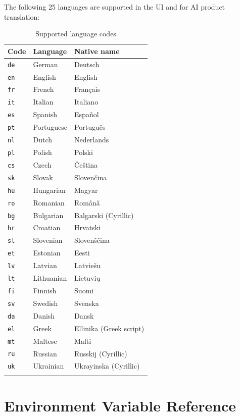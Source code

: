 \documentclass[12pt,a4paper,twoside]{report}
\newcommand{\code}[1]{\texttt{#1}}
\begin{document}
The following 25 languages are supported in the UI and for AI product
translation:

\begin{longtable}{@{}lll@{}}
  \toprule
  \textbf{Code} & \textbf{Language} & \textbf{Native name} \\
  \midrule
  \endhead
  \code{de} & German     & Deutsch \\
  \code{en} & English    & English \\
  \code{fr} & French     & Fran\c{c}ais \\
  \code{it} & Italian    & Italiano \\
  \code{es} & Spanish    & Espa\~{n}ol \\
  \code{pt} & Portuguese & Portugu\^{e}s \\
  \code{nl} & Dutch      & Nederlands \\
  \code{pl} & Polish     & Polski \\
  \code{cs} & Czech      & \v{C}e\v{s}tina \\
  \code{sk} & Slovak     & Sloven\v{c}ina \\
  \code{hu} & Hungarian  & Magyar \\
  \code{ro} & Romanian   & Rom\^{a}n\u{a} \\
  \code{bg} & Bulgarian  & Balgarski (Cyrillic) \\
  \code{hr} & Croatian   & Hrvatski \\
  \code{sl} & Slovenian  & Sloven\v{s}\v{c}ina \\
  \code{et} & Estonian   & Eesti \\
  \code{lv} & Latvian    & Latvie\v{s}u \\
  \code{lt} & Lithuanian & Lietuvi\k{u} \\
  \code{fi} & Finnish    & Suomi \\
  \code{sv} & Swedish    & Svenska \\
  \code{da} & Danish     & Dansk \\
  \code{el} & Greek      & Ellinika (Greek script) \\
  \code{mt} & Maltese    & Malti \\
  \code{ru} & Russian    & Russkij (Cyrillic) \\
  \code{uk} & Ukrainian  & Ukrayinska (Cyrillic) \\
  \bottomrule
  \caption{Supported language codes}
  \label{tab:languages}
\end{longtable}

\chapter{Environment Variable Reference}
\label{app:envvars}
\end{document}

